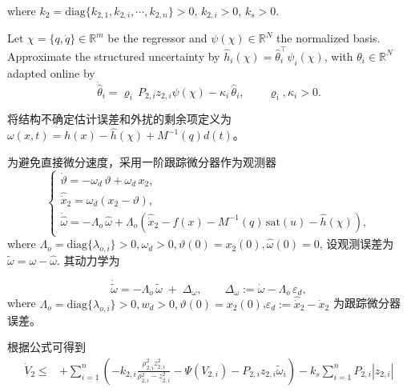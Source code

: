 \documentclass[pdflatex,sn-mathphys-num]{sn-jnl}%
\theoremstyle{thmstyleone}%
\theoremstyle{thmstyletwo}%
\theoremstyle{thmstylethree}%
\begin{document}
where $k_2=\mathrm{diag}\{k_{2,1},k_{2,i},\cdots,k_{2,n}\}>0$, $k_{2,i}>0$, $k_s>0$.

Let $\chi=\{q,\dot{q}\}\in\mathbb{R}^m$ be the regressor and $\psi(\chi)\in\mathbb{R}^{N}$ the normalized basis. Approximate the structured uncertainty by 
\( \hat h_i(\chi)=\hat \theta_i^\top \psi_i(\chi)\),
with $\theta_i\in\mathbb{R}^{N}  $ adapted online by
\begin{equation}\label{eq:theta-law}
\dot{\hat{\theta}}_i = \varrho_i\,P_{2,i} z_{2,i}\psi(\chi) - \kappa_i\,\hat{\theta}_i,\qquad
\varrho_i,\kappa_i>0.
\end{equation}

将结构不确定估计误差和外扰的剩余项定义为
$\omega(x,t)=h(x)-\hat h(\chi)+ M^{-1}(q) d(t)$。

为避免直接微分速度，采用一阶跟踪微分器作为观测器
\begin{equation}
	\begin{cases}
\dot\vartheta =-\omega_d\,\vartheta+\omega_d\,x_2,  \\
\hat{\dot x}_2=\omega_d(x_2-\vartheta),   \\
\dot{\hat \omega}= -\Lambda_o\,\hat \omega
+\Lambda_o\left(\hat{\dot x}_2 - f(x) - M^{-1}(q)\,\mathrm{sat}(u) - \hat h(\chi)\right),
\end{cases}
\end{equation}
where $\Lambda_o=\mathrm{diag}\{\lambda_{o,i}\}>0, \omega_d>0, \vartheta(0)=x_2(0), \hat \omega(0)=0$,
设观测误差为 $\tilde \omega=\omega-\hat\omega$. 其动力学为

$$
\dot{\tilde\omega}
= -\Lambda_o\,\tilde\omega\;+\;\Delta_\omega,\qquad
\Delta_\omega:=\dot\omega-\Lambda_o\,\varepsilon_d,
$$
where $\Lambda_o=\mathrm{diag}\{\lambda_{o,i}\}>0, w_d>0, \vartheta(0)=x_2(0)$,$\varepsilon_d:=\hat{\dot x}_2-\dot x_2$ 为跟踪微分器误差。


根据公式可得到
\begin{equation}
	\begin{aligned}
	\dot V_2
\le&+\sum_{i=1}^n \left( - k_{2,i}\frac{\rho_{2,i}^2 z_{2,i}^2}{\rho_{2,i}^2-z_{2,i}^2}-\Psi(V_{2,i})-P_{2,i}z_{2,i}\tilde{\omega}_i  \right) -k_s\sum_{i=1}^n P_{2,i} \left\lvert z_{2,i}\right\rvert
\end{aligned}
\end{equation}
\end{document}
